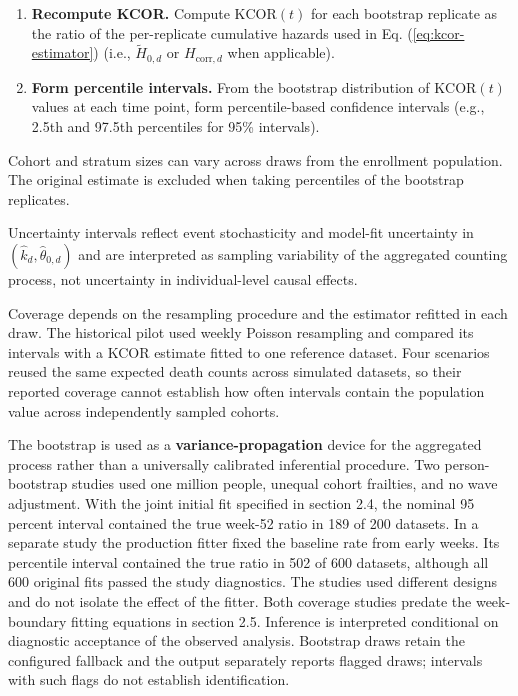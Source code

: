 \documentclass[
]{article}
\begin{document}
\begin{enumerate}
\item
  \textbf{Recompute KCOR.} Compute \(\mathrm{KCOR}(t)\) for each bootstrap replicate as the ratio of the per-replicate cumulative hazards used in Eq. (\ref{eq:kcor-estimator}) (i.e., \(\tilde H_{0,d}\) or \(H_{\mathrm{corr},d}\) when applicable).
\item
  \textbf{Form percentile intervals.} From the bootstrap distribution of \(\mathrm{KCOR}(t)\) values at each time point, form percentile-based confidence intervals (e.g., 2.5th and 97.5th percentiles for 95\% intervals).
\end{enumerate}

Cohort and stratum sizes can vary across draws from the enrollment population. The original estimate is excluded when taking percentiles of the bootstrap replicates.

Uncertainty intervals reflect event stochasticity and model-fit uncertainty in \((\hat{k}_d,\hat{\theta}_{0,d})\) and are interpreted as sampling variability of the aggregated counting process, not uncertainty in individual-level causal effects.

Coverage depends on the resampling procedure and the estimator refitted in each draw. The historical pilot used weekly Poisson resampling and compared its intervals with a KCOR estimate fitted to one reference dataset. Four scenarios reused the same expected death counts across simulated datasets, so their reported coverage cannot establish how often intervals contain the population value across independently sampled cohorts.

The bootstrap is used as a \textbf{variance-propagation} device for the aggregated process rather than a universally calibrated inferential procedure. Two person-bootstrap studies used one million people, unequal cohort frailties, and no wave adjustment. With the joint initial fit specified in section 2.4, the nominal 95 percent interval contained the true week-52 ratio in 189 of 200 datasets. In a separate study the production fitter fixed the baseline rate from early weeks. Its percentile interval contained the true ratio in 502 of 600 datasets, although all 600 original fits passed the study diagnostics. The studies used different designs and do not isolate the effect of the fitter. Both coverage studies predate the week-boundary fitting equations in section 2.5. Inference is interpreted conditional on diagnostic acceptance of the observed analysis. Bootstrap draws retain the configured fallback and the output separately reports flagged draws; intervals with such flags do not establish identification.
\end{document}

